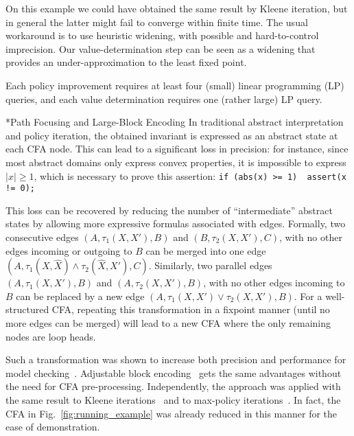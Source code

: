 \documentclass{llncs}
\makeatletter
\newcommand{\cfa}{\textsc{CFA}\xspace}
\renewcommand{\paragraph}{\@startsection{paragraph}{4}{\z@}{0.8ex \@plus 0ex \@minus 1ex}{-1em}{\normalfont\normalsize\bfseries}}
\makeatother
\begin{document}
\begin{example}
 On this example we could have obtained the
 same result by Kleene iteration,
 but in general the latter might fail to converge within finite time.
 The usual workaround is to use heuristic widening,
 with possible and hard-to-control imprecision.
Our value-determination step can be seen as a widening that provides an under-approximation to the least fixed point.

    Each policy improvement requires at least four (small) linear programming
    (LP) queries, and each value determination requires one (rather large)
    LP query.
    \label{ex:running-example-trace}
\end{example}

\paragraph*{Path Focusing and Large-Block Encoding}
In traditional abstract interpretation and policy iteration, the obtained
invariant is expressed as an abstract state at each \cfa node.
This can lead to a significant loss in precision: for instance, since most
abstract domains only express convex properties, it is impossible to express
$|x| \geq 1$, which is necessary to prove this assertion:
\texttt{if (abs(x) >= 1) { assert(x != 0); }}

This loss can be recovered by reducing the number of ``intermediate''
abstract states by allowing more expressive formulas associated with edges.
Formally, two consecutive edges $(A, \tau_1(X, X'), B)$ and $(B, \tau_2(X, X'),
C)$, with no other edges incoming or outgoing to $B$ can be merged into one edge
 $(A, \tau_1(X, \hat{X}) \land \tau_2(\hat{X}, X'), C)$.
Similarly, two parallel edges $(A, \tau_1(X, X'), B)$ and $(A, \tau_2(X,X'),
B)$, with no other edges incoming to $B$ can be replaced by a new edge
$(A, \tau_1(X, X') \lor \tau_2(X, X'), B)$.
For a well-structured \cfa, repeating this transformation in a fixpoint manner
(until no more edges can be merged) will lead to a new \cfa where the only
remaining nodes are loop heads.

Such a transformation was shown to increase both precision and performance for
model checking~\cite{large_block_encoding}.
Adjustable block encoding~\cite{adjustable_block_encoding} gets the same
advantages without the need for \cfa pre-processing.
Independently, the approach was applied with the same result to Kleene
iterations~\cite{path_focusing} and to max-policy
iterations~\cite{policy_iteration_path_focusing}.
In fact, the \cfa in Fig.~\ref{fig:running_example} was already
reduced in this manner for the ease of demonstration.
\end{document}
